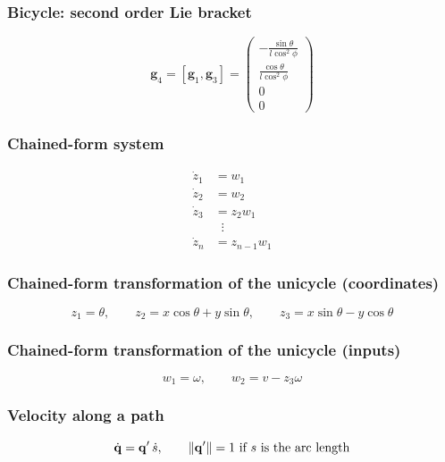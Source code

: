 \subsubsection{Bicycle: second order Lie bracket}
\begin{equation*}
    \mathbf g_4=[\mathbf g_1,\mathbf g_3]=\begin{pmatrix}-\frac{\sin\theta}{l\cos^2\phi}\\\frac{\cos\theta}{l\cos^2\phi}\\0\\0\end{pmatrix}
\end{equation*}

\subsubsection{Chained-form system}
\begin{align*}
    \dot z_1&=w_1\\
    \dot z_2&=w_2\\
    \dot z_3&=z_2w_1\\
    &\;\;\vdots\\
    \dot z_n&=z_{n-1}w_1
\end{align*}

\subsubsection{Chained-form transformation of the unicycle (coordinates)}
\begin{equation*}
    z_1=\theta,\qquad z_2=x\cos\theta+y\sin\theta,\qquad z_3=x\sin\theta-y\cos\theta
\end{equation*}

\subsubsection{Chained-form transformation of the unicycle (inputs)}
\begin{equation*}
    w_1=\omega,\qquad w_2=v-z_3\omega
\end{equation*}

\subsubsection{Velocity along a path}
\begin{equation*}
    {\dot{\mathbf q}}={\mathbf q}'\,\dot s,\qquad \|{\mathbf q}'\|=1\text{ if $s$ is the arc length}
\end{equation*}

